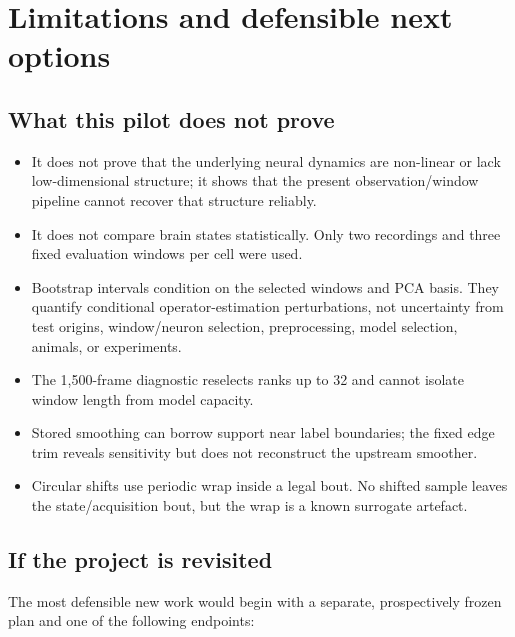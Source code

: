 \documentclass[11pt,a4paper]{article}
\begin{document}
\section{Limitations and defensible next options}

\subsection{What this pilot does not prove}

\begin{itemize}
  \item It does not prove that the underlying neural dynamics are non-linear or
  lack low-dimensional structure; it shows that the present observation/window
  pipeline cannot recover that structure reliably.
  \item It does not compare brain states statistically. Only two recordings and
  three fixed evaluation windows per cell were used.
  \item Bootstrap intervals condition on the selected windows and PCA basis.
  They quantify conditional operator-estimation perturbations, not uncertainty
  from test origins, window/neuron selection, preprocessing, model selection,
  animals, or experiments.
  \item The 1,500-frame diagnostic reselects ranks up to 32 and cannot isolate
  window length from model capacity.
  \item Stored smoothing can borrow support near label boundaries; the fixed
  edge trim reveals sensitivity but does not reconstruct the upstream smoother.
  \item Circular shifts use periodic wrap inside a legal bout. No shifted sample
  leaves the state/acquisition bout, but the wrap is a known surrogate artefact.
\end{itemize}

\subsection{If the project is revisited}

The most defensible new work would begin with a separate, prospectively frozen
plan and one of the following endpoints:
\end{document}
